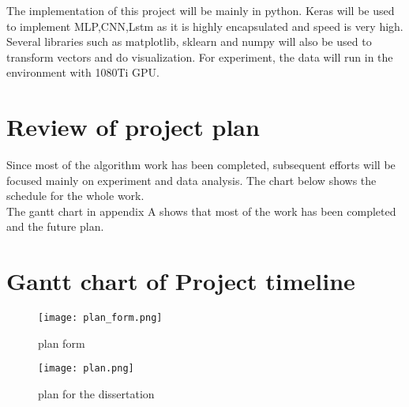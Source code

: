 \documentclass{elegantpaper}
\begin{document}
The implementation of this project will be mainly in python. Keras will be used to implement MLP,CNN,Lstm as it is highly encapsulated and speed is very high. 
Several libraries such as matplotlib, sklearn and numpy will also be used to transform vectors and do visualization. For experiment, the data will run in the environment with 1080Ti GPU.


\section{Review of project plan}

 Since most of the algorithm work has been completed, subsequent efforts will be focused mainly on experiment and data analysis. The chart below shows the schedule for the whole work.\\

 The gantt chart in appendix A shows that most of the work has been completed and the future plan.
 
 










 \appendix
 \section{Gantt chart of Project timeline}

 
\begin{figure}[!ht]
	\centering
	\texttt{[image: plan\_form.png]}
	\caption{plan form\label{fig:plan_form}}
\end{figure}


\begin{figure}[!ht]
	\centering
	\texttt{[image: plan.png]}
	\caption{plan for the dissertation\label{plan:lstm}}
\end{figure}
\end{document}
